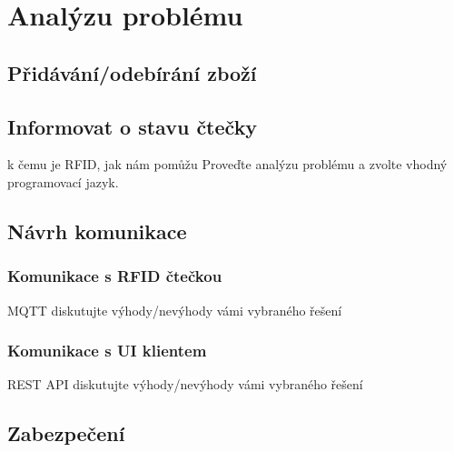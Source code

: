 \documentclass{bakalarka}
\begin{document}
\chapter{Analýzu problému}
	
		
	\section{Přidávání/odebírání zboží}
	\section{Informovat o stavu čtečky}
		k čemu je RFID, jak nám pomůžu
		Proveďte analýzu problému a zvolte vhodný programovací jazyk.
	
	\section{Návrh komunikace}
		\subsection{Komunikace s RFID čtečkou}
			MQTT
			diskutujte výhody/nevýhody vámi vybraného řešení
		
		\subsection{Komunikace s UI klientem}
			REST API
			diskutujte výhody/nevýhody vámi vybraného řešení
 
	\section{Zabezpečení}




				





\appendix


\end{document}
